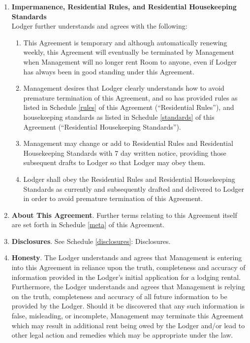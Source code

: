 \documentclass[12pt,letterpaper]{article}
\newcommand{\rules}{Residential Rules}
\newcommand{\standards}{Residential Housekeeping Standards}
\newcommand{\meta}{About This Agreement}
\newcommand{\disclosures}{Disclosures}
\newcommand{\management}{Management}
\newcommand{\room}{Room}
\begin{document}
\begin{enumerate}
		\item \textbf{Impermanence, \rules{}, and \standards{}}\\
			Lodger further understands and agrees with the following: 
			\begin{enumerate}
				\item This Agreement is temporary and although automatically renewing weekly, this Agreement will eventually be terminated by \management{} when \management{} will no longer rent \room{} to anyone, even if Lodger has always been in good standing under this Agreement. 
				\item \management{} desires that Lodger clearly understands how to avoid premature termination of this Agreement, and so has provided rules as listed in Schedule \ref{rules} of this Agreement (``\rules{}''), and housekeeping standards as listed in Schedule \ref{standards} of this Agreement (``\standards{}''). 
				\item \management{} may change or add to \rules{} and \standards{} with 7 day written notice, providing those subsequent drafts to Lodger so that Lodger may obey them. 
				\item Lodger shall obey the \rules{} and \standards{} as currently and subsequently drafted and delivered to Lodger in order to avoid premature termination of this Agreement.
			\end{enumerate}

		\item \textbf{\meta{}}.
			Further terms relating to this Agreement itself are set forth in Schedule \ref{meta} of this Agreement.

		\item \textbf{\disclosures{}}. See Schedule \ref{disclosures}: \disclosures{}.
		\item \textbf{Honesty}.
			The Lodger understands and agrees that \management{} is entering into this Agreement in reliance upon the truth, completeness and accuracy of information provided in the Lodger's initial application for a lodging rental. Furthermore, the Lodger understands and agrees that \management{} is relying on the truth, completeness and accuracy of all future information to be provided by the Lodger. Should it be discovered that any such information is false, misleading, or incomplete, \management{} may terminate this Agreement which may result in additional rent being owed by the Lodger and/or lead to other legal action and remedies which may be appropriate under the law. 

	\end{enumerate}
\end{document}
